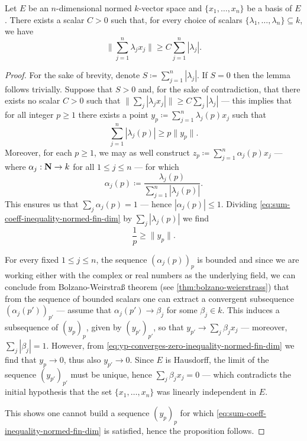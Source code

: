 \begin{lemma}
\label{lem:finite-normed-scalars-inequality}
Let \(E\) be an \(n\)-dimensional normed \(k\)-vector space and \(\{x_1, \dots,
x_n\}\) be a basis of \(E\). There exists a scalar \(C > 0\) such that, for
every choice of scalars \(\{\lambda_1, \dots, \lambda_n\} \subseteq k\), we have
\[
\bigg\| \sum_{j=1}^n \lambda_j x_j \bigg\| \geq C \sum_{j=1}^n |\lambda_j|.
\]
\end{lemma}

\begin{proof}
For the sake of brevity, denote \(S \coloneq \sum_{j=1}^{n} |\lambda_j|\). If
\(S = 0\) then the lemma follows trivially. Suppose that \(S > 0\) and, for the
sake of contradiction, that there exists no scalar \(C > 0\) such that \(\|
\sum_j | \lambda_j x_j | \| \geq C \sum_j |\lambda_j|\) --- this implies that
for all integer \(p \geq 1\) there exists a point \(y_p \coloneq \sum_{j=1}^n
\lambda_j(p) x_j\) such that
\begin{equation}\label{eq:sum-coeff-inequality-normed-fin-dim}
\sum_{j=1}^n |\lambda_j(p)| \geq p \| y_p \|.
\end{equation}
Moreover, for each \(p \geq 1\), we may as well construct \(z_p \coloneq
\sum_{j=1}^n \alpha_j(p) x_j\) --- where \(\alpha_j: \mathbf{N} \to k\) for all \(1 \leq
j \leq n\) --- for which
\[
\alpha_j(p) \coloneq \frac{\lambda_j(p)}{\sum_{j=1}^n |\lambda_j(p)|}.
\]
This ensures us that \(\sum_j \alpha_j(p) = 1\) --- hence \(|\alpha_j(p)| \leq
1\). Dividing \cref{eq:sum-coeff-inequality-normed-fin-dim} by \(\sum_j
|\lambda_j(p)|\) we find
\begin{equation}\label{eq:yp-converges-zero-inequality-normed-fin-dim}
\frac 1 p \geq \| y_p \|.
\end{equation}

For every fixed \(1 \leq j \leq n\), the sequence \((\alpha_j(p))_p\) is bounded
and since we are working either with the complex or real numbers as the
underlying field, we can conclude from Bolzano-Weirstra{\ss} theorem (see
\cref{thm:bolzano-weierstrass}) that from the sequence of bounded scalars one
can extract a convergent subsequence \((\alpha_j(p'))_{p'}\) --- assume that
\(\alpha_j(p') \to \beta_j\) for some \(\beta_j \in k\). This induces a
subsequence of \((y_p)_{p}\), given by \((y_{p'})_{p'}\), so that \(y_{p'} \to
\sum_j \beta_j x_j\) --- moreover, \(\sum_j |\beta_j| = 1\). However, from
\cref{eq:yp-converges-zero-inequality-normed-fin-dim} we find that \(y_p \to
0\), thus also \(y_{p'} \to 0\). Since \(E\) is Hausdorff, the limit of the
sequence \((y_{p'})_{p'}\) must be unique, hence \(\sum_j \beta_j x_j = 0\)
--- which contradicts the initial hypothesis that the set \(\{x_1, \dots,
x_n\}\) was linearly independent in \(E\).

This shows one cannot build a sequence \((y_p)_p\) for which
\cref{eq:sum-coeff-inequality-normed-fin-dim} is satisfied, hence the
proposition follows.
\end{proof}


